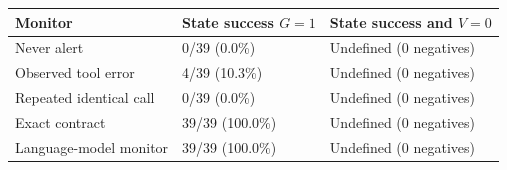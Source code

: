 \begin{tabular}{lll}
\toprule
Monitor & State success $G=1$ & State success and $V=0$\\
\midrule
Never alert & 0/39 (0.0\%) & Undefined (0 negatives)\\
Observed tool error & 4/39 (10.3\%) & Undefined (0 negatives)\\
Repeated identical call & 0/39 (0.0\%) & Undefined (0 negatives)\\
Exact contract & 39/39 (100.0\%) & Undefined (0 negatives)\\
Language-model monitor & 39/39 (100.0\%) & Undefined (0 negatives)\\
\bottomrule
\end{tabular}

